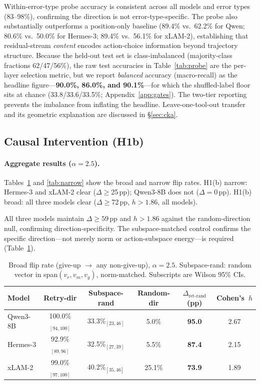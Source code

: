 \documentclass{article}
\begin{document}
Within-error-type probe accuracy is consistent across all models and
error types (83--98\%), confirming the direction is not
error-type-specific.
The probe also substantially outperforms a position-only baseline
(89.4\% vs.\ 62.2\% for Qwen; 80.6\% vs.\ 50.0\% for Hermes-3;
89.4\% vs.\ 56.1\% for xLAM-2), establishing that residual-stream
\emph{content} encodes action-choice information beyond trajectory
structure.
Because the held-out test set is class-imbalanced (majority-class fractions
62/47/56\%), the raw test accuracies in Table~\ref{tab:probe} are the per-layer
selection metric, but we report \emph{balanced} accuracy (macro-recall) as the headline
figure---\textbf{90.0\%, 86.0\%, and 90.1\%}---for which the shuffled-label floor sits at
chance (33.8/33.6/33.5\%; Appendix~\ref{app:gates}). The two-tier reporting prevents the
imbalance from inflating the headline.
Leave-one-tool-out transfer and its geometric explanation are discussed
in \S\ref{sec:cka}.

\subsection{Causal Intervention (H1b)}

\paragraph{Aggregate results ($\alpha{=}2.5$).}
Tables~\ref{tab:broad} and \ref{tab:narrow} show the broad and narrow
flip rates.
H1(b) narrow: Hermes-3 and xLAM-2 clear ($\Delta\geq$25\,pp);
Qwen3-8B does not ($\Delta{=}0$\,pp).
H1(b) broad: all three models clear ($\Delta\geq$72\,pp,
$h>1.86$, all models).

All three models maintain $\Delta\geq59$\,pp and $h>1.86$ against the
random-direction null, confirming direction-specificity.
The subspace-matched control confirms the specific direction---not
merely norm or action-subspace energy---is required (Table~\ref{tab:broad}).

\begin{table}[t]
\caption{Broad flip rate (give-up $\to$ any non-give-up), $\alpha{=}2.5$.
Subspace-rand: random vector in span$(v_r,v_m,v_g)$, norm-matched.
Subscripts are Wilson 95\% CIs.}
\label{tab:broad}
\centering\small
\begin{tabular}{lccccc}
\toprule
Model & Retry-dir & Subspace-rand & Random-dir & $\Delta_{\text{ret-rand}}$ (pp) & Cohen's~$h$ \\
\midrule
Qwen3-8B & 100.0\%$_{\scriptscriptstyle[94,100]}$ & 33.3\%$_{\scriptscriptstyle[23,46]}$ & 5.0\%  & \textbf{95.0} & 2.67 \\
Hermes-3 & 92.9\%$_{\scriptscriptstyle[89,96]}$   & 32.5\%$_{\scriptscriptstyle[27,39]}$ & 5.5\%  & \textbf{87.4} & 2.15 \\
xLAM-2   & 99.0\%$_{\scriptscriptstyle[97,100]}$  & 40.2\%$_{\scriptscriptstyle[35,46]}$ & 25.1\% & \textbf{73.9} & 1.89 \\
\bottomrule
\end{tabular}
\end{table}
\end{document}
